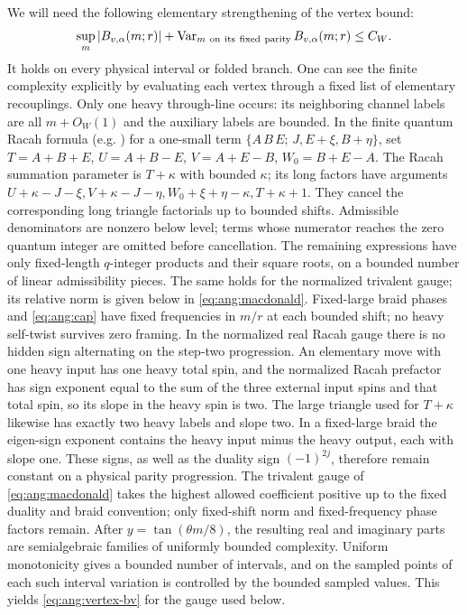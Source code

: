 We will need the following elementary strengthening of the vertex bound:
\begin{equation}
 \label{eq:ang:vertex-bv}
 \sup_m|B_{v,\alpha}(m;r)|+
      \operatorname{Var}_{m\ {\rm on\ its\ fixed\ parity}}B_{v,\alpha}(m;r)
          \leq C_W .
\end{equation}
It holds on every physical interval or folded branch. One can see the finite complexity explicitly by evaluating each vertex through a fixed list of elementary recouplings. Only one heavy through-line occurs: its neighboring channel labels are all \(m+O_W(1)\) and the auxiliary labels are bounded. In the finite quantum Racah formula (e.g. \cite[Sec.~2, Eqs.~(6)--(7)]{TaylorWoodward2006}) for a one-small term \(\{A\,B\,E;\,J,E+\xi,B+\eta\}\), set \(T=A+B+E\), \(U=A+B-E\), \(V=A+E-B\), \(W_0=B+E-A\). The Racah summation parameter is \(T+\kappa\) with bounded \(\kappa\); its long factors have arguments \(U+\kappa-J-\xi,V+\kappa-J-\eta,W_0+\xi+\eta-\kappa,T+\kappa+1\). They cancel the corresponding long triangle factorials up to bounded shifts. Admissible denominators are nonzero below level; terms whose numerator reaches the zero quantum integer are omitted before cancellation. The remaining expressions have only fixed-length \(q\)-integer products and their square roots, on a bounded number of linear admissibility pieces. The same holds for the normalized trivalent gauge; its relative norm is given below in \eqref{eq:ang:macdonald}. Fixed-large braid phases and \eqref{eq:ang:cap} have fixed frequencies in \(m/r\) at each bounded shift; no heavy self-twist survives zero framing. In the normalized real Racah gauge there is no hidden sign alternating on the step-two progression. An elementary move with one heavy input has one heavy total spin, and the normalized Racah prefactor has sign exponent equal to the sum of the three external input spins and that total spin, so its slope in the heavy spin is two. The large triangle used for \(T+\kappa\) likewise has exactly two heavy labels and slope two. In a fixed-large braid the eigen-sign exponent contains the heavy input minus the heavy output, each with slope one. These signs, as well as the duality sign \((-1)^{2j}\), therefore remain constant on a physical parity progression. The trivalent gauge of \eqref{eq:ang:macdonald} takes the highest allowed coefficient positive up to the fixed duality and braid convention; only fixed-shift norm and fixed-frequency phase factors remain. After \(y=\tan(\theta m/8)\), the resulting real and imaginary parts are semialgebraic families of uniformly bounded complexity. Uniform monotonicity gives a bounded number of intervals, and on the sampled points of each such interval variation is controlled by the bounded sampled values. This yields \eqref{eq:ang:vertex-bv} for the gauge used below.

